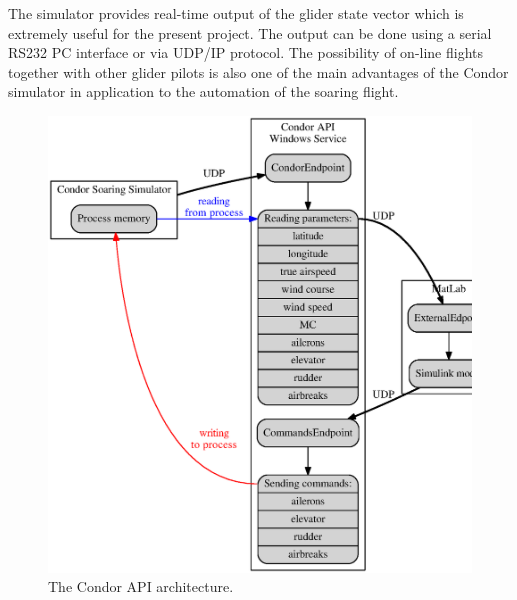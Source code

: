 \documentclass[letterpaper, 10 pt, conference]{ieeeconf}  %
\begin{document}
The simulator provides real-time output of the glider state vector which is extremely useful for the present project. The output can be done using a serial RS232 PC interface or via UDP/IP protocol. The possibility of on-line flights together with other glider pilots is also one of the main advantages of the Condor simulator in application to the automation of the soaring flight.
\begin{figure}[thpb]
  \centering
  \includegraphics[scale=0.4]{Figures/api_arch.eps}
  \caption{The Condor API architecture.}
  \label{fig:api_arch}
\end{figure}
\end{document}
